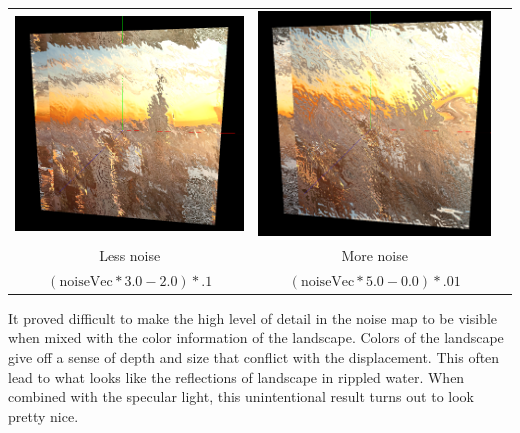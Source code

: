 \documentclass[twoside,11pt]{article}
\theoremstyle{definition}
\begin{document}
\begin{center}\begin{tabular}{ccc}
		\includegraphics[width=.4\textwidth]{less_noise} &
		\includegraphics[width=.4\textwidth]{more_noise}\\
		Less noise & More noise\\
		$(\text{noiseVec} * 3.0 - 2.0) * .1$ & $(\text{noiseVec} * 5.0 - 0.0) * .01$
\end{tabular}\end{center}

It proved difficult to make the high level of detail in the noise map to be visible when mixed with the color information of the landscape. Colors of the landscape give off a sense of depth and size that conflict with the displacement. This often lead to what looks like the reflections of landscape in rippled water. When combined with the specular light, this unintentional result turns out to look pretty nice.
\end{document}
